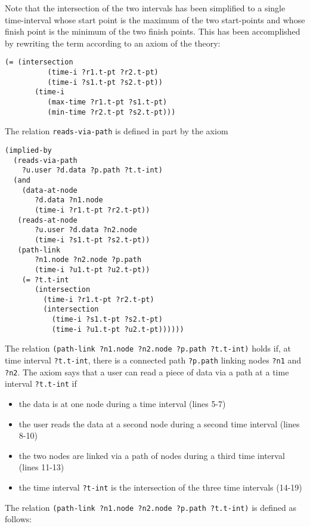 Note that the intersection of the two intervals has been simplified to a single time-interval whose start point is the maximum of the two start-points and whose finish point is the minimum of the two finish points.  
This has been accomplished by rewriting the term according to an axiom of the theory:

\begin{lstlisting}[numbers=none]
 (= (intersection
          (time-i ?r1.t-pt ?r2.t-pt)
          (time-i ?s1.t-pt ?s2.t-pt))
       (time-i
          (max-time ?r1.t-pt ?s1.t-pt)
          (min-time ?r2.t-pt ?s2.t-pt)))
\end{lstlisting}


The relation \verb'reads-via-path' is defined in part by the axiom

\begin{lstlisting}
(implied-by
  (reads-via-path
    ?u.user ?d.data ?p.path ?t.t-int)
  (and
    (data-at-node 
       ?d.data ?n1.node 
       (time-i ?r1.t-pt ?r2.t-pt))
   (reads-at-node 
       ?u.user ?d.data ?n2.node 
       (time-i ?s1.t-pt ?s2.t-pt))
   (path-link 
       ?n1.node ?n2.node ?p.path 
       (time-i ?u1.t-pt ?u2.t-pt))   
    (= ?t.t-int
       (intersection
	     (time-i ?r1.t-pt ?r2.t-pt)
	     (intersection
           (time-i ?s1.t-pt ?s2.t-pt)
           (time-i ?u1.t-pt ?u2.t-pt))))))
\end{lstlisting}

The relation \verb'(path-link ?n1.node ?n2.node ?p.path ?t.t-int)' holds if, at time interval \verb'?t.t-int', there is a connected path \verb'?p.path' linking nodes \verb'?n1' and \verb'?n2'. 
The axiom says that a user can read a piece of data via a path at a time interval \verb'?t.t-int' if
\begin{itemize}
\item the data is at one node during a time interval (lines 5-7)
\item the user reads the data at a second node during a second time interval (lines 8-10)
\item the two nodes are linked via a path of nodes during a third time interval (lines 11-13)
\item the time interval \verb'?t-int' is the intersection of the three time intervals (14-19)
\end{itemize}

The relation \verb'(path-link ?n1.node ?n2.node ?p.path ?t.t-int)' is defined as follows:

